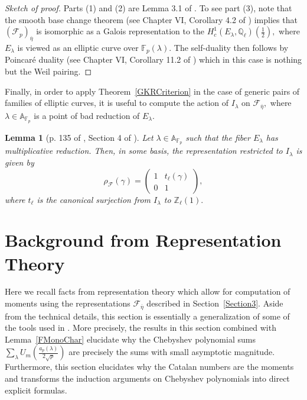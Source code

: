 \documentclass[12pt]{amsart}
\newtheorem{lemma}[theorem]{Lemma}
\theoremstyle{definition}
\theoremstyle{remark}
\numberwithin{equation}{section}
\def\A{\mathbb A}
\def\F{{\mathbb F}}
\def\Z{{\mathbb Z}}
\def\Q{{\mathbb Q}}
\def\Z{\mathbb{Z}}
\def\Q{\mathbb{Q}}
\def\F{\mathbb{F}}
\begin{document}
\begin{proof}[Sketch of proof]
    Parts (1) and (2) are Lemma 3.1 of \cite{RangMoyen}. To see part (3), note that the smooth base change theorem (see Chapter VI, Corollary 4.2 of \cite{ECMilneBook}) implies that $(\mathcal{F}_p)_{\overline{\eta}}$ is isomorphic as a Galois representation to the $H_c^1(E_\lambda,\Q_\ell)\left(\frac{1}{2}\right),$ where $E_\lambda$ is viewed as an elliptic curve over $\F_p(\lambda).$ The self-duality then follows by Poincar\'e duality (see Chapter VI, Corollary 11.2 of \cite{ECMilneBook}) which in this case is nothing but the Weil pairing.
\end{proof}

Finally, in order to apply Theorem~\ref{GKRCriterion} in the case of generic pairs of families of elliptic curves, it is useful to compute the action of $I_\lambda$ on $\mathcal{F}_{\overline{\eta}},$ where $\lambda\in\A_{\F_p}$ is a point of bad reduction of $E_\lambda.$

\begin{lemma}[p. 135 of \cite{RangMoyen}, Section 4 of \cite{WeilII}]\label{InertiaAction}
    Let $\lambda\in\A_{\F_p}$ such that the fiber $E_\lambda$ has multiplicative reduction. Then, in some basis, the representation restricted to $I_\lambda$ is given by
    $$
    \rho_{\mathcal{F}}(\gamma) = \begin{pmatrix}
        1 & t_\ell(\gamma) \\
        0 & 1
    \end{pmatrix},
    $$
    where $t_\ell$ is the canonical surjection from $I_\lambda$ to $\Z_\ell(1).$
\end{lemma}

\section{Background from Representation Theory}\label{Section4}

Here we recall facts from representation theory which allow for computation of moments using the representations $\mathcal{F}_{\overline{\eta}}$ described in Section~\ref{Section3}. Aside from the technical details, this section is essentially a generalization of some of the tools used in \cite{HGFDistributionOnoSaikia,ono2024distributionhessianvaluesgaussian,grove2024hypergeometricmomentshecketrace}. More precisely, the results in this section combined with Lemma~\ref{FMonoChar} elucidate why the Chebyshev polynomial sums
$
\sum\limits_{\lambda}U_m\left(\frac{a_{p}(\lambda)}{2\sqrt{p}}\right)
$
are precisely the sums with small asymptotic magnitude. Furthermore, this section elucidates why the Catalan numbers are the moments and transforms the induction arguments on Chebyshev polynomials into direct explicit formulas.
\end{document}
